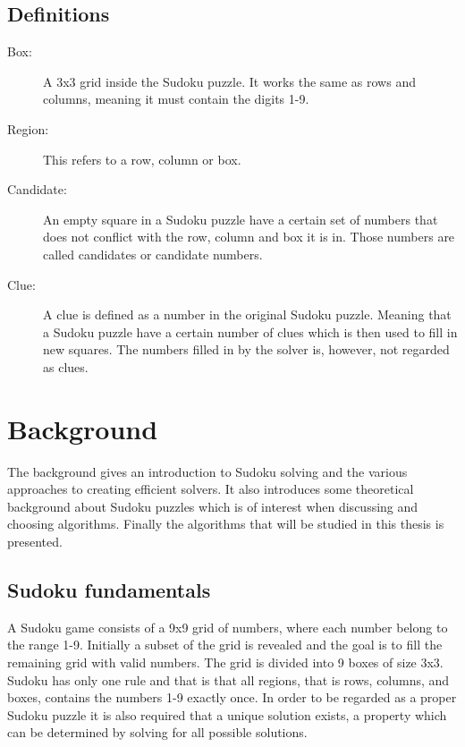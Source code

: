 \documentclass[a4paper,11pt]{kth-mag}
\begin{document}
\section{Definitions}
\begin{description}
    \item[Box:] A 3x3 grid inside the Sudoku puzzle. It works the same as rows and columns, meaning it must contain the digits 1-9.
    \item[Region:] This refers to a row, column or box.
    \item[Candidate:] An empty square in a Sudoku puzzle have a certain set of numbers that does not conflict with the row, column and box it is in. Those numbers are called candidates or candidate numbers.
    \item[Clue:] A clue is defined as a number in the original Sudoku puzzle. Meaning that a Sudoku puzzle have a certain number of clues which is then used to fill in new squares. The numbers filled in by the solver is, however, not regarded as clues.
\end{description}

\chapter{Background}
\label{sec:background}
The background gives an introduction to Sudoku solving and the various approaches to creating efficient solvers. It also introduces some theoretical background about Sudoku puzzles which is of interest when discussing and choosing algorithms. Finally the algorithms that will be studied in this thesis is presented.

\FloatBarrier
\section{Sudoku fundamentals}
A Sudoku game consists of a 9x9 grid of numbers, where each number belong to the range 1-9.
Initially a subset of the grid is revealed and the goal is to fill the remaining grid with valid numbers.
The grid is divided into 9 boxes of size 3x3.
Sudoku has only one rule and that is that all regions, that is rows, columns, and boxes, contains the numbers 1-9 exactly once.\cite{17clueProof}
In order to be regarded as a proper Sudoku puzzle it is also required that a unique solution exists, a property which can be determined by solving for all possible solutions.
\end{document}

